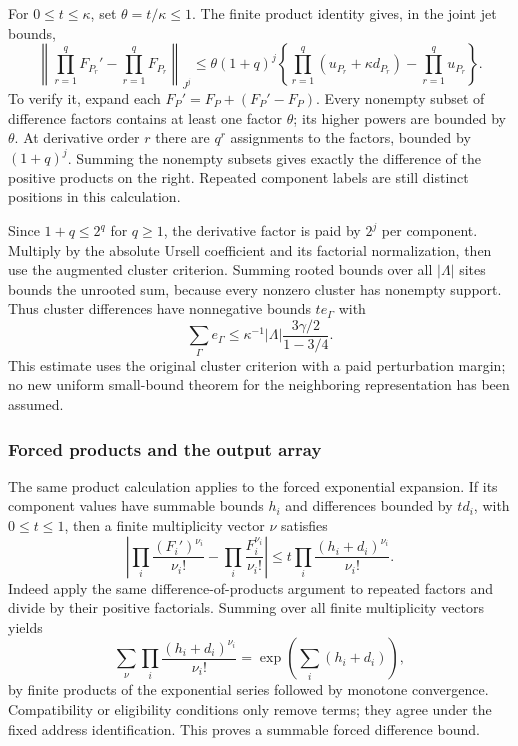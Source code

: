 For $0\le t\le\kappa$, set $\theta=t/\kappa\le1$. The finite product
identity gives, in the joint jet bounds,
\begin{equation}\label{eq:parameter-product-difference}
 \left\|\prod_{r=1}^qF_{P_r}'-\prod_{r=1}^qF_{P_r}\right\|_{J^j}
 \le\theta(1+q)^j
       \left\{\prod_{r=1}^q(u_{P_r}+\kappa d_{P_r})
                                  -\prod_{r=1}^q u_{P_r}\right\}.
\end{equation}
To verify it, expand each $F_P'=F_P+(F_P'-F_P)$. Every nonempty
subset of difference factors contains at least one factor $\theta$;
its higher powers are bounded by $\theta$. At derivative order $r$
there are $q^r$ assignments to the factors, bounded by $(1+q)^j$.
Summing the nonempty subsets gives exactly the difference of the
positive products on the right. Repeated component labels are still
distinct positions in this calculation.

Since $1+q\le2^q$ for $q\ge1$, the derivative factor is paid by
$2^j$ per component. Multiply by the absolute Ursell coefficient
and its factorial normalization, then use the augmented cluster
criterion. Summing rooted bounds over all $|\Lambda|$ sites bounds
the unrooted sum, because every nonzero cluster has nonempty support.
Thus cluster differences have nonnegative bounds $t e_\Gamma$ with
\[
 \sum_\Gamma e_\Gamma
       \le\kappa^{-1}|\Lambda|\frac{3\gamma/2}{1-3/4}.
\]
This estimate uses the original cluster criterion with a paid
perturbation margin; no new uniform small-bound theorem for the
neighboring representation has been assumed.

\subsubsection{Forced products and the output array}
The same product calculation applies to the forced exponential
expansion. If its component values have summable bounds $h_i$ and
differences bounded by $t d_i$, with $0\le t\le1$, then a finite
multiplicity vector $\nu$ satisfies
\[
 \left|\prod_i\frac{(F_i')^{\nu_i}}{\nu_i!}
             -\prod_i\frac{F_i^{\nu_i}}{\nu_i!}\right|
       \le t\prod_i\frac{(h_i+d_i)^{\nu_i}}{\nu_i!}.
\]
Indeed apply the same difference-of-products argument to repeated
factors and divide by their positive factorials. Summing over all
finite multiplicity vectors yields
\[
 \sum_\nu\prod_i\frac{(h_i+d_i)^{\nu_i}}{\nu_i!}
                         =\exp\!\left(\sum_i(h_i+d_i)\right),
\]
by finite products of the exponential series followed by monotone
convergence. Compatibility or eligibility conditions only remove
terms; they agree under the fixed address identification. This proves
a summable forced difference bound.

